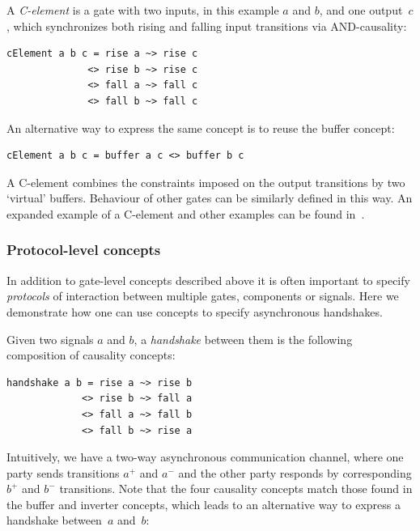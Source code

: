 \documentclass[british, 10pt, conference, compsocconf]{IEEEtran}
\begin{document}
\noindent A \emph{C-element} is a gate with two inputs, in this example $a$ and $b$, and one
output~$c$, which synchronizes both rising and falling input transitions
via AND-causality:


\begin{verbatim}
cElement a b c = rise a ~> rise c 
              <> rise b ~> rise c
              <> fall a ~> fall c 
              <> fall b ~> fall c
\end{verbatim}

An alternative way to express the same concept is to reuse the buffer concept:

\begin{verbatim}
cElement a b c = buffer a c <> buffer b c
\end{verbatim}

A C-element combines the constraints imposed on the output
transitions by two `virtual' buffers. Behaviour of other gates can be similarly
defined in this way. An expanded example of a C-element and other examples can 
be found in~\cite{2015_Beaumont_MEMOCODE}.


\subsubsection{Protocol-level concepts} In addition to gate-level concepts
described above it is often important to specify \emph{protocols}
of interaction between multiple gates, components or signals. Here we 
demonstrate how one can use concepts to specify asynchronous handshakes.

Given two signals $a$ and $b$, a \emph{handshake} between them is
the following composition of causality concepts:

\begin{verbatim}
handshake a b = rise a ~> rise b 
             <> rise b ~> fall a 
             <> fall a ~> fall b 
             <> fall b ~> rise a
\end{verbatim}

Intuitively, we have a two-way asynchronous communication channel,
where one party sends transitions $a^{+}$ and $a^{-}$ and the other
party responds by corresponding $b^{+}$ and $b^{-}$ transitions.
Note that the four causality concepts match those found
in the buffer and inverter concepts, which leads to an alternative
way to express a handshake between~$a$ and~$b$:
\end{document}

